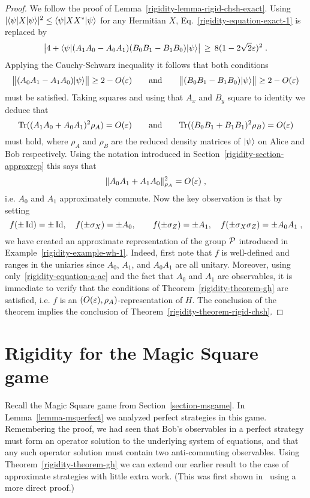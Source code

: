 \begin{proof}
We follow the proof of Lemma~\ref{rigidity-lemma-rigid-chsh-exact}. Using $|\langle\psi|X|\psi\rangle|^2 \leq \langle\psi|XX^*|\psi\rangle$ for any Hermitian $X$,
Eq.~\eqref{rigidity-equation-exact-1} is replaced by
\[ \big|4+\langle\psi|(A_1A_0-A_0A_1) (B_0B_1-B_1B_0)|\psi\rangle \big|\,\geq\, 8(1-2\sqrt{2}\varepsilon)^2\;.\]
Applying the Cauchy-Schwarz inequality it follows that both conditions
\[ \big\|(A_0A_1-A_1A_0)|\psi\rangle\big\| \geq 2-O(\varepsilon) \qquad \text{and}\qquad\big\|(B_0B_1-B_1B_0)|\psi\rangle\big\| \geq 2-O(\varepsilon)\]
must be satisfied. Taking squares and using that $A_x$ and $B_y$ square to identity we deduce that 
$$\mathrm{Tr}((A_1A_0 + A_0A_1)^2\rho_A) = O({\varepsilon})\qquad \text{and}\qquad \mathrm{Tr}((B_0B_1+B_1B_1)^2 \rho_B) = O({\varepsilon})$$
must hold, where $\rho_A$ and $\rho_B$ are the reduced density matrices of $|\psi\rangle$ on Alice and Bob respectively. 
Using the notation introduced in Section~\ref{rigidity-section-approxrep} this says that 
\begin{equation}\label{rigidity-equation-a-ac}
\|A_0A_1 + A_1A_0\|_{\rho_A}^2 = O({\varepsilon})\;,
\end{equation}
 i.e. $A_0$ and $A_1$ approximately commute. Now the key observation is that by setting 
$$ f(\pm \mathop{\rm Id}\nolimits)=\pm\mathop{\rm Id}\nolimits,\quad f(\pm\sigma_X)=\pm A_0,\quad\quad f(\pm\sigma_Z)=\pm A_1,\quad f(\pm\sigma_X\sigma_Z) = \pm A_0A_1\;,$$
we have created an approximate representation of the group $\mathcal{P}$ introduced in Example~\ref{rigidity-example-wh-1}. Indeed, first note that $f$ is well-defined and ranges in the uniaries since $A_0$, $A_1$, and $A_0A_1$ are all unitary. Moreover, using only~\eqref{rigidity-equation-a-ac} and the fact that $A_0$ and $A_1$ are observables, it is immediate to verify that the conditions of Theorem~\ref{rigidity-theorem-gh} are satisfied, i.e. $f$ is an $(O({\varepsilon}),\rho_A)$-representation of $H$. The conclusion of the theorem implies the conclusion of Theorem~\ref{rigidity-theorem-rigid-chsh}.
\end{proof}



\section{Rigidity for the Magic Square game}
\label{section-msrigid}


Recall the Magic Square game from Section~\ref{section-msgame}. In Lemma~\ref{lemma-msperfect} we analyzed perfect strategies in this game. Remembering the proof, we had seen that Bob's observables in a perfect strategy must form an operator solution to the underlying system of equations, and that any such operator solution must contain two anti-commuting observables. Using Theorem~\ref{rigidity-theorem-gh} we can extend our earlier result to the case of approximate strategies with little extra work. (This was first shown in~\cite{wu2016device} using a more direct proof.)

